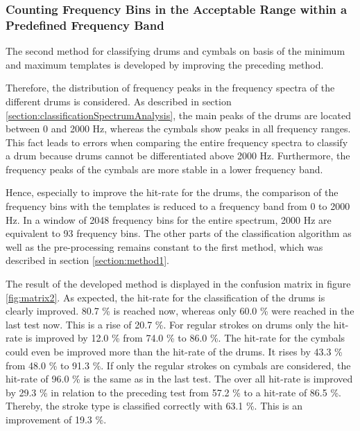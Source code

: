 
\newpage
\subsubsection{Counting Frequency Bins in the Acceptable Range within a Predefined Frequency Band}
\label{section:shapeComparisonClassification2}

The second method for classifying drums and cymbals on basis of the minimum and maximum templates is developed by improving the preceding method.

Therefore, the distribution of frequency peaks in the frequency spectra of the different drums is considered. As described in section \ref{section:classificationSpectrumAnalysis}, the main peaks of the drums are located between 0 and 2000 Hz, whereas the cymbals show peaks in all frequency ranges. This fact leads to errors when comparing the entire frequency spectra to classify a drum because drums cannot be differentiated above 2000 Hz. Furthermore, the frequency peaks of the cymbals are more stable in a lower frequency band.

Hence, especially to improve the hit-rate for the drums, the comparison of the frequency bins with the templates is reduced to a frequency band from 0 to 2000 Hz. In a window of 2048 frequency bins for the entire spectrum, 2000 Hz are equivalent to 93 frequency bins. The other parts of the classification algorithm as well as  the pre-processing remains constant to the first method, which was described in section \ref{section:method1}. 

The result of the developed method is displayed in the confusion matrix in figure \ref{fig:matrix2}. As expected, the hit-rate for the classification of the drums is clearly improved. 80.7 \% is reached now, whereas only 60.0 \% were reached in the last test now. This is a rise of 20.7 \%. For regular strokes on drums only the hit-rate is improved by 12.0 \% from 74.0 \% to 86.0 \%. The hit-rate for the cymbals could even be improved more than the hit-rate of the drums. It rises by 43.3 \% from 48.0 \% to 91.3 \%. If only the regular strokes on cymbals are considered, the hit-rate  of 96.0 \% is the same as in the last test. The over all hit-rate is improved by 29.3 \% in relation to the preceding test from 57.2 \% to a hit-rate of 86.5 \%. Thereby, the stroke type is classified correctly with 63.1 \%. This is an improvement of 19.3 \%.

